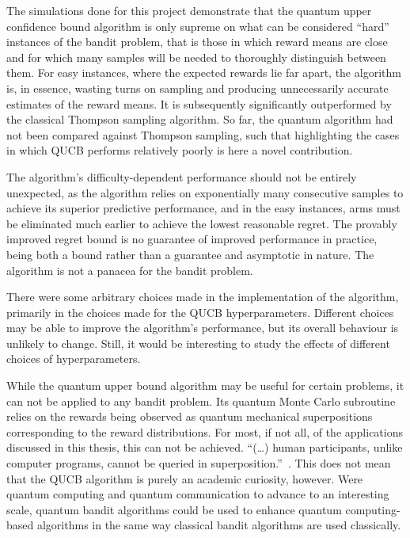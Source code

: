 The simulations done for this project demonstrate that the quantum upper confidence bound algorithm is only supreme on what can be considered \enquote{hard} instances of the bandit problem, that is those in which reward means are close and for which many samples will be needed to thoroughly distinguish between them.
For easy instances, where the expected rewards lie far apart, the algorithm is, in essence, wasting turns on sampling and producing unnecessarily accurate estimates of the reward means.
It is subsequently significantly outperformed by the classical Thompson sampling algorithm.
So far, the quantum algorithm had not been compared against Thompson sampling, such that highlighting the cases in which QUCB performs relatively poorly is here a novel contribution.

The algorithm's difficulty-dependent performance should not be entirely unexpected, as the algorithm relies on exponentially many consecutive samples to achieve its superior predictive performance, and in the easy instances, arms must be eliminated much earlier to achieve the lowest reasonable regret.
The provably improved regret bound is no guarantee of improved performance in practice, being both a bound rather than a guarantee and asymptotic in nature.
The algorithm is not a panacea for the bandit problem.

There were some arbitrary choices made in the implementation of the algorithm, primarily in the choices made for the QUCB hyperparameters.
Different choices may be able to improve the algorithm's performance, but its overall behaviour is unlikely to change.
Still, it would be interesting to study the effects of different choices of hyperparameters.

While the quantum upper bound algorithm may be useful for certain problems, it can not be applied to any bandit problem.
Its quantum Monte Carlo subroutine relies on the rewards being observed as quantum mechanical superpositions corresponding to the reward distributions.
For most, if not all, of the applications discussed in this thesis\footnotemark, this can not be achieved.
\enquote{(\dots) human participants, unlike computer programs, cannot be queried in superposition.}~\autocite{wang2021}.
This does not mean that the QUCB algorithm is purely an academic curiosity, however.
Were quantum computing and quantum communication to advance to an interesting scale, quantum bandit algorithms could be used to enhance quantum computing-based algorithms in the same way classical bandit algorithms are used classically.

